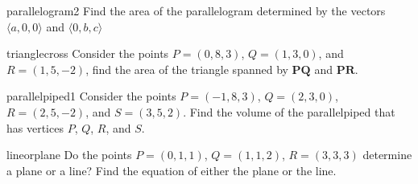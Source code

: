 \begin{problem}{parallelogram2}
    Find the area of the parallelogram determined by the vectors $\langle a, 0, 0\rangle$ and $\langle 0, b, c\rangle$
\end{problem}

\begin{problem}{trianglecross}
    Consider the points $P= (0,8,3)$, $Q= (1,3,0)$, and $R= (1,5,-2)$, find the area of the triangle spanned by   $\bm{PQ}$ and  $\bm{PR}$.
\end{problem}

\begin{problem}{parallelpiped1}
    Consider the points $P= (-1,8,3)$, $Q= (2,3,0)$, $R= (2,5,-2)$, and $S = (3,5,2)$. Find the volume of the parallelpiped that has vertices $P$, $Q$, $R$, and $S$.
    
\end{problem}

\begin{problem}{lineorplane}
    Do the points $P = (0,1,1)$, $Q = (1,1,2)$, $R = (3,3,3)$ determine a plane or a line?  Find the equation of either the plane or the line.
\end{problem}